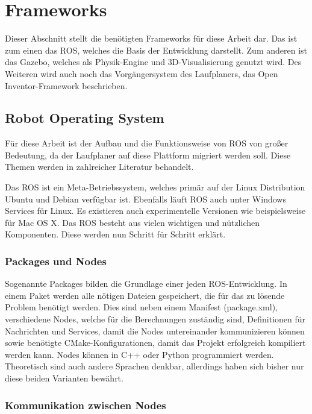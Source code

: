 \section{Frameworks}

Dieser Abschnitt stellt die benötigten Frameworks für diese Arbeit dar. Das ist zum einen das \ac{ROS}, welches die Basis der Entwicklung darstellt. Zum anderen ist das Gazebo, welches als Physik-Engine und 3D-Visualisierung genutzt wird. Des Weiteren wird auch noch das Vorgängersystem des Laufplaners, das Open Inventor-Framework beschrieben.

\subsection{Robot Operating System}

Für diese Arbeit ist der Aufbau und die Funktionsweise von \ac{ROS} von großer Bedeutung, da der Laufplaner auf diese Plattform migriert werden soll. Diese Themen werden in zahlreicher Literatur behandelt. \autocite{rosAnOpenSourceRobotOperatingSystem, learningROSForRoboticsProgramming, gentleIntroductionToROS}

Das \ac{ROS} ist ein Meta-Betriebssystem, welches primär auf der Linux Distribution Ubuntu und Debian verfügbar ist. Ebenfalls läuft \ac{ROS} auch unter Windows Services für Linux. Es existieren auch experimentelle Versionen wie beispielsweise für Mac OS X. Das \ac{ROS} besteht aus vielen wichtigen und nützlichen Komponenten. Diese werden nun Schritt für Schritt erklärt.

\subsubsection{Packages und Nodes}

Sogenannte Packages bilden die Grundlage einer jeden \ac{ROS}-Entwicklung. In einem Paket werden alle nötigen Dateien gespeichert, die für das zu lösende Problem benötigt werden. Dies sind neben einem Manifest (package.xml), verschiedene Nodes, welche für die Berechnungen zuständig sind, Definitionen für Nachrichten und Services, damit die Nodes untereinander kommunizieren können sowie benötigte CMake-Konfigurationen, damit das Projekt erfolgreich kompiliert werden kann. Nodes können in C++ oder Python programmiert werden. Theoretisch sind auch andere Sprachen denkbar, allerdings haben sich bisher nur diese beiden Varianten bewährt.

\subsubsection{Kommunikation zwischen Nodes}

